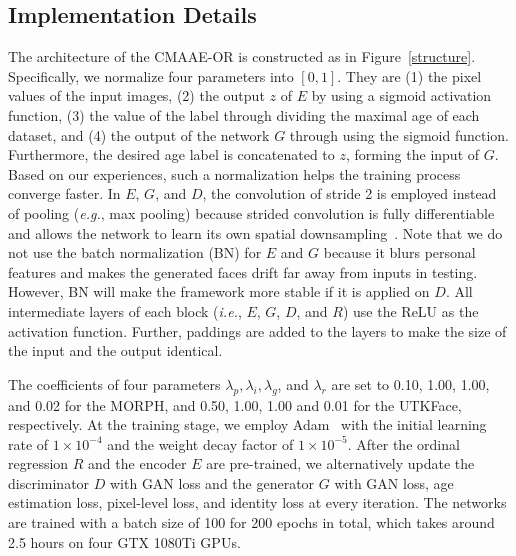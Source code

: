 \documentclass{article}
\begin{document}
\subsection{Implementation Details}
The architecture of the CMAAE-OR is constructed as in Figure~\ref{structure}. Specifically, we normalize four parameters into $[0, 1]$. They are (1) the pixel values of the input images, (2) the output $z$ of $E$ by using a sigmoid activation function, (3) the value of the label through dividing the maximal age of each dataset, and (4) the output of the network $G$ through using the sigmoid function. Furthermore, the desired age label is concatenated to $z$, forming the input of $G$. Based on our experiences, such a normalization helps the training process converge faster. In $E$, $G$, and $D$, the convolution of stride 2 is employed instead of pooling ({\it e.g.}, max pooling) because strided convolution is fully differentiable and allows the network to learn its own spatial downsampling~\cite{radford2015unsupervised}. Note that we do not use the batch normalization (BN) for $E$ and $G$ because it blurs personal features and makes the generated faces drift far away from inputs in testing. However, BN will make the framework more stable if it is applied on $D$. All intermediate layers of each block ({\it i.e.}, $E$, $G$, $D$, and $R$) use the ReLU as the activation function. Further, paddings are added to the layers to make the size of the input and the output identical.

The coefficients of four parameters $\lambda_p, \lambda_i, \lambda_g$, and $\lambda_r$ are set to 0.10, 1.00, 1.00, and 0.02 for the MORPH, and 0.50, 1.00, 1.00 and 0.01 for the UTKFace, respectively. At the training stage, we employ Adam~\cite{kingma2014adam} with the initial learning rate of $1\times 10^{-4}$ and the weight decay factor of $1\times 10^{-5}$. After the ordinal regression $R$ and the encoder $E$ are pre-trained, we alternatively update the discriminator $D$ with GAN loss and the generator $G$ with GAN loss, age estimation loss, pixel-level loss, and identity loss at every iteration. The networks are trained with a batch size of 100 for 200 epochs in total, which takes around 2.5 hours on four GTX 1080Ti GPUs.
\end{document}
